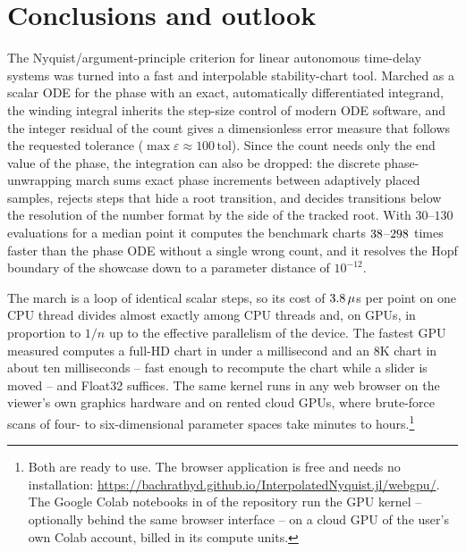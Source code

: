 \section{Conclusions and outlook}\label{sec:conclusion}

The Nyquist/argument-principle criterion for linear autonomous time-delay
systems was turned into a fast and interpolable stability-chart tool. Marched
as a scalar ODE for the phase with an exact, automatically differentiated
integrand, the winding integral inherits the step-size control of modern ODE
software, and the integer residual of the count gives a dimensionless error
measure that follows the requested tolerance
($\max\varepsilon\approx100\,\mathrm{tol}$). Since the count needs only the end
value of the phase, the integration can also be dropped: the discrete
phase-unwrapping march sums exact phase increments between adaptively placed
samples, rejects steps that hide a root transition, and decides transitions
below the resolution of the number format by the side of the tracked root.
With $30$--$130$ evaluations for a median point it computes the benchmark
charts $38$--$298$ times faster than the phase ODE
without a single wrong count, and it resolves the Hopf boundary of the showcase
down to a parameter distance of $10^{-12}$.

The march is a loop of identical scalar steps, so its cost of
$3.8\,\mu$s per point on one CPU thread divides almost exactly among
CPU threads and, on GPUs, in proportion to $1/n$ up to the effective
parallelism of the device. The fastest GPU measured computes a full-HD chart
in under a millisecond and an 8K chart in about ten milliseconds -- fast enough
to recompute the chart while a slider is moved -- and Float32 suffices. The
same kernel runs in any web browser on the viewer's own graphics hardware and
on rented cloud GPUs, where brute-force scans of four- to six-dimensional
parameter spaces take minutes to hours.\footnote{Both are ready to use. The
browser application is free and needs no installation:
\url{https://bachrathyd.github.io/InterpolatedNyquist.jl/webgpu/}. The Google
Colab notebooks in  of the repository run the GPU kernel --
optionally behind the same browser interface -- on a cloud GPU of the user's
own Colab account, billed in its compute units.}


